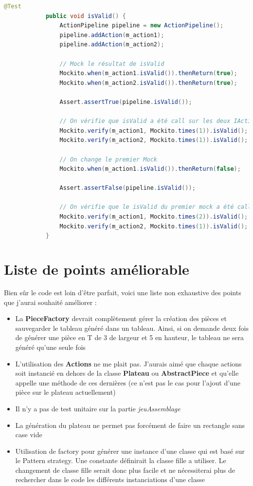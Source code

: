 \documentclass[report]{BetterDocument}
\begin{document}
		\begin{lstlisting}[gobble=12, language=Java, caption=Exemple de test avec mockito]
			@Test
			public void isValid() {
				ActionPipeline pipeline = new ActionPipeline();
				pipeline.addAction(m_action1);
				pipeline.addAction(m_action2);

				// Mock le résultat de isValid
				Mockito.when(m_action1.isValid()).thenReturn(true);
				Mockito.when(m_action2.isValid()).thenReturn(true);

				Assert.assertTrue(pipeline.isValid());

				// On vérifie que isValid a été call sur les deux IActions
				Mockito.verify(m_action1, Mockito.times(1)).isValid();
				Mockito.verify(m_action2, Mockito.times(1)).isValid();

				// On change le premier Mock
				Mockito.when(m_action1.isValid()).thenReturn(false);

				Assert.assertFalse(pipeline.isValid());

				// On vérifie que le isValid du premier mock a été call une fois de plus et pas l'autre
				Mockito.verify(m_action1, Mockito.times(2)).isValid();
				Mockito.verify(m_action2, Mockito.times(1)).isValid();
			}
		\end{lstlisting}

	\section{Liste de points améliorable}

		Bien sûr le code est loin d'être parfait, voici une liste non exhaustive des points que j'aurai souhaité améliorer :

		\begin{itemize}
			\item{La \textbf{PieceFactory} devrait complètement gérer la création des pièces et sauvegarder le tableau généré dans un tableau. Ainsi, si on demande deux fois de générer une pièce en T de 3 de largeur et 5 en hauteur, le tableau ne sera généré qu'une seule fois}
			\item{L'utilisation des \textbf{Actions} ne me plait pas. J'aurais aimé que chaque actions soit instancié en dehors de la classe \textbf{Plateau} ou \textbf{AbstractPiece} et qu'elle appelle une méthode de ces dernières (ce n'est pas le cas pour l'ajout d'une pièce sur le plateau actuellement)}
			\item{Il n'y a pas de test unitaire sur la partie \textit{jeuAssemblage}}
			\item{La génération du plateau ne permet pas forcément de faire un rectangle sans case vide}
			\item{Utilisation de factory pour générer une instance d'une classe qui est basé sur le Pattern strategy. Une constante définirait la classe fille a utiliser. Le changement de classe fille serait donc plus facile et ne nécessiterai plus de rechercher dans le code les différents instanciations d'une classe}
		\end{itemize}
\end{document}
